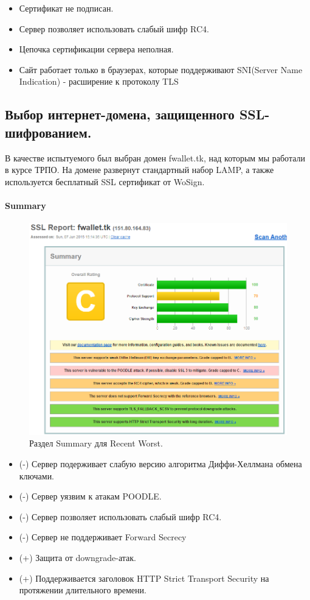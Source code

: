 \documentclass[a4paper, 14pt]{article}				%
\begin{document}
\begin{itemize}
\item{Сертификат не подписан.}
\item{Сервер позволяет использовать слабый шифр RC4.}
\item{Цепочка сертификации сервера неполная.}
\item{Сайт работает только в браузерах, которые поддерживают SNI(Server Name Indication) - расширение к протоколу TLS}
\end{itemize}

\newpage
\subsection{Выбор интернет-домена, защищенного SSL-шифрованием.}
В качестве испытуемого был выбран домен fwallet.tk, над которым мы работали в курсе ТРПО. На домене развернут стандартный набор LAMP, а также используется бесплатный SSL сертификат от WoSign.\\

\paragraph{Summary\\}
\begin{figure}[h!]
\centering
\includegraphics[width=\textwidth]{rsrc/lab7_fw_sum}
\caption{Раздел Summary для Recent Worst.}
\end{figure}
\begin{itemize}
\item{(-) Сервер подерживает слабую версию алгоритма Диффи-Хеллмана обмена ключами.}
\item{(-) Сервер уязвим к атакам POODLE.}
\item{(-) Сервер позволяет использовать слабый шифр RC4.}
\item{(-) Сервер не поддерживает Forward Secrecy}
\item{(+) Защита от downgrade-атак.}
\item{(+) Поддерживается заголовок HTTP Strict Transport Security на протяжении длительного времени.}
\end{itemize}
\end{document}
